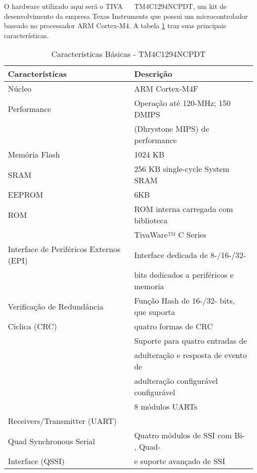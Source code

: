 O hardware utilizado aqui será o  TIVA \texttrademark ~~ TM4C1294NCPDT, um kit de desenvolvimento da empresa Texas Instruments que possui um microcontrolador baseado no processador ARM Cortex-M4. A tabela \ref{tab:CaracteristicasMicro} traz suas principais características.


\begin{table}[!h]
\centering
\caption{Características Básicas - TM4C1294NCPDT \cite{DATASHEET_TIVA}}
\label{tab:CaracteristicasMicro}
\begin{tabular}{|l|l|}
\hline
\cellcolor[HTML]{343434} \color[HTML]{FFFFFF} Características & \cellcolor[HTML]{343434} \color[HTML]{FFFFFF} Descrição \\
\hline
Núcleo & ARM Cortex-M4F\\
\hline
Performance & Operação até 120-MHz; 150 DMIPS \\
& (Dhrystone MIPS) de performance \\
\hline
Memória Flash & 1024 KB  \\
\hline
SRAM & 256 KB single-cycle System SRAM \\
\hline
EEPROM & 6KB  \\
\hline
ROM & ROM interna carregada com biblioteca  \\
 & TivaWare™  C Series \\
\hline
Interface de Periféricos Externos (EPI)  & Interface dedicada de 8-/16-/32-   \\ 
 &  bits dedicados a periféricos e memoria\\
\hline
 Verificação de Redundância & Função Hash de 16-/32- bits,  que suporta  \\
  Cíclica (CRC)   & quatro formas de CRC \\
\hline
\begin{comment}
 Função de Adulteração & Suporte para quatro entradas de  \\
 & adulteração e resposta de evento de  \\
 & adulteração configurável configurável  \\
\hline
\end{comment}
Universal Asynchronous  & 8 módulos UARTs \\
Receivers/Transmitter (UART) & \\
\hline
Quad Synchronous Serial & Quatro módulos de SSI com Bi- , Quad-\\
Interface (QSSI) &  e suporte avançado de SSI\\

\end{tabular}
\end{table}
